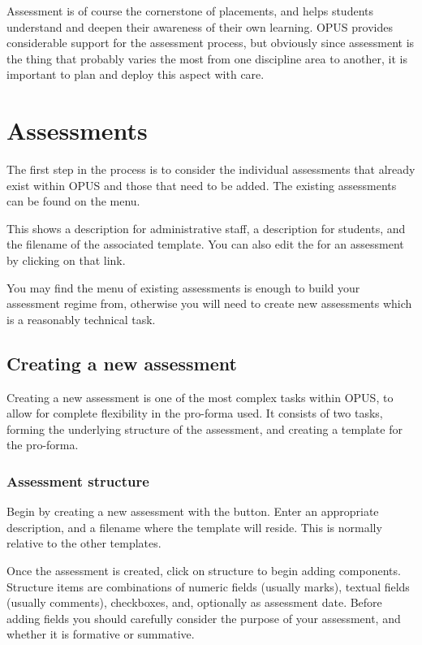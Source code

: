 \documentclass[12 pt]{book}
\begin{document}
Assessment is of course the cornerstone of placements, and helps students
understand and deepen their awareness of their own learning. OPUS 
provides considerable support for the assessment process, but obviously
since assessment is the thing that probably varies the most from one
discipline area to another, it is important to plan and deploy this
aspect with care.

\section{Assessments}

The first step in the process is to consider the individual assessments
that already exist within OPUS and those that need to be added. The
existing assessments can be found on the 
 menu.

This shows a description for administrative staff, a description for
students, and the filename of the associated template. You can also
edit the  for an assessment by clicking on that link.

You may find the menu of existing assessments is enough to build your
assessment regime from, otherwise you will need to create new assessments
which is a reasonably technical task.

\subsection{Creating a new assessment}

Creating a new assessment is one of the most complex tasks within OPUS,
to allow for complete flexibility in the pro-forma used. It consists of
two tasks, forming the underlying structure of the assessment, and
creating a template for the pro-forma.

\subsubsection{Assessment structure}

Begin by creating a new assessment with the  button.
Enter an appropriate description, and a filename where the template
will reside. This is normally relative to the other templates.

Once the assessment is created, click on structure to begin adding
components. Structure items are combinations of numeric fields (usually
marks), textual fields (usually comments), checkboxes, and, optionally
as assessment date. Before adding fields you should carefully consider
the purpose of your assessment, and whether it is formative or summative.
\end{document}
